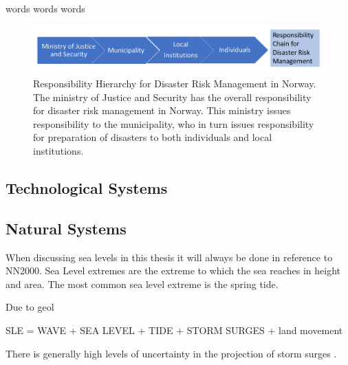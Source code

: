 \paragraph{}


words words words
\begin{figure} [h]
    \centering
    \includegraphics[width=1\textwidth]{fig_theory/responsibility drm.png}
    \caption{Responsibility Hierarchy for Disaster Risk Management in Norway. The ministry of Justice and Security has the overall responsibility for disaster risk management in Norway. This ministry issues responsibility to the municipality, who in turn issues responsibility for preparation of disasters to both individuals and local institutions.}
    \label{fig:drm_responsibility}
\end{figure}
\paragraph{}

\subsection{Technological Systems}



\subsection{Natural Systems }
When discussing sea levels in this thesis it will always be done in reference to NN2000. Sea Level extremes are the extreme to which the sea reaches in height and area. The most common sea level extreme is the spring tide. 

Due to geol

SLE = WAVE + SEA LEVEL + TIDE + STORM SURGES + land movement
\cite{hanssen-bauer_climate_2017}

There is generally high levels of uncertainty in the projection of storm surges \cite{nilsen_sealevelchangefornorway_nodate}.

